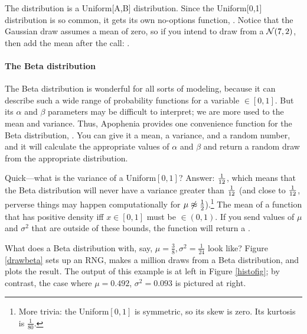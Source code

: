 The  distribution is a Uniform[A,B] distribution. Since the
Uniform[0,1] distribution is so common, it gets its own no-options
function, . Notice that the Gaussian draw
assumes a mean of zero, so if you intend to draw from a ${\cal N}(7,2)$,
then add the mean after the call: .

\paragraph{The Beta distribution}\label{beta}
The Beta distribution is wonderful for all sorts of modeling, because
it can describe such a wide range of probability functions for a
variable $\in [0,1]$.  But its $\alpha$ and $\beta$ parameters may be
difficult to interpret; we are more used to the mean and variance. Thus,
Apophenia provides one convenience function for the Beta distribution,
. You can give it a mean, a variance, and
a random number, and it will calculate the appropriate values of $\alpha$
and $\beta$ and return a random draw from the appropriate distribution.

Quick---what is the variance of a Uniform$[0,1]$? Answer: ${1\over 12}$,
which means that the Beta distribution will never have a variance greater
than ${1\over 12}$ (and close to ${1\over 12}$, perverse things may
happen computationally for $\mu \not\approx {1\over 2}$).\footnote{More
trivia: the Uniform$[0,1]$ is symmetric, so its skew is zero. Its
kurtosis is $\frac{1}{80}$.} The mean of a
function that has positive density iff $x \in [0,1]$ must be
$\in (0,1)$. If you send  values of $\mu$
and $\sigma^2$ that are outside of these bounds, the function will
return a .


What does a Beta distribution with, say, $\mu = \frac{3}{8}, \sigma^2 =
\frac{1}{24}$ look like? Figure \ref{drawbeta} sets up an RNG,
makes a million draws from a Beta distribution, and plots the result.
The output of this example is at left in Figure \ref{histofig}; by
contrast, the case where $\mu=0.492$, $\sigma^2 = 0.093$ is pictured at
right.



\def\bebox#1{\vbox{\hbox{\rotatebox{-90}{\texttt{[image: \#1]}}} }}

